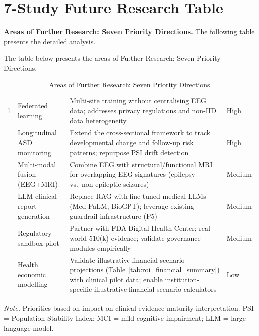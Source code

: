 \section*{7-Study Future Research Table}
\label{sec:app_ch5_tab_future_studies}


\noindent\textbf{Areas of Further Research: Seven Priority Directions.} The following table presents the detailed analysis.

\noindent The table below presents the areas of Further Research: Seven Priority Directions.

\begin{table}[H]
\tablestripes
\tablefontsize
\caption{Areas of Further Research: Seven Priority Directions}
\begin{tabularx}{\textwidth}{@{} p{0.4cm} p{2.8cm} L p{1.8cm} @{}}
\toprule
\thead{\#} &  &  &  \\
 & Federated learning & Multi-site training without centralising EEG data; addresses privacy regulations and non-IID data heterogeneity~\cite{rieke2020federated} & High \\
\addlinespace
{} & Longitudinal ASD monitoring & Extend the cross-sectional framework to track developmental change and follow-up risk patterns; repurpose PSI drift detection & High \\
 & Multi-modal fusion (EEG+MRI) & Combine EEG with structural/functional MRI for overlapping EEG signatures (epilepsy vs.\ non-epileptic seizures) & Medium \\
 & LLM clinical report generation & Replace RAG with fine-tuned medical LLMs (Med-PaLM, BioGPT); leverage existing guardrail infrastructure (P5) & Medium \\
 & Regulatory sandbox pilot & Partner with FDA Digital Health Center; real-world 510(k) evidence; validate governance modules empirically & Medium \\
 & Health economic modelling & Validate illustrative financial-scenario projections (Table~\ref{tab:roi_financial_summary}) with clinical pilot data; enable institution-specific illustrative financial scenario calculators & Low \\
\bottomrule
\end{tabularx}
\vspace{0.5em}\noindent\textit{Note.} Priorities based on impact on clinical evidence-maturity interpretation. PSI = Population Stability Index; MCI = mild cognitive impairment; LLM = large language model.
\end{table}


